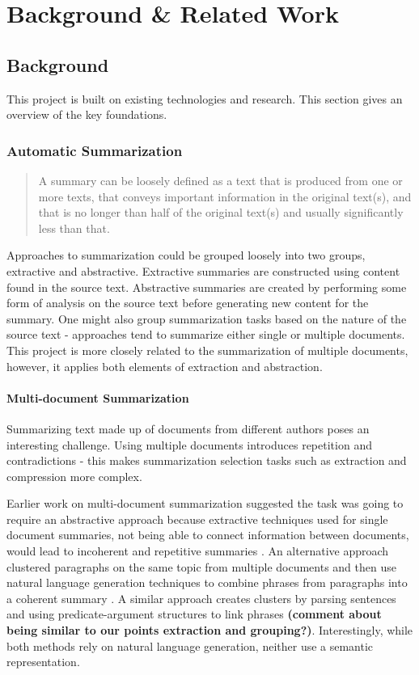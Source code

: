 \chapter{Background \& Related Work\label{chap:background-related}}
  \section{Background}
    This project is built on existing technologies and research. This section gives an overview of the key foundations.

    \subsection{Automatic Summarization}
      \blockquote{A summary can be loosely defined as a text that is produced from one or more texts, that conveys important information in the original text(s), and that is no longer than half of the original text(s) and usually significantly less than that.} \cite{radev2002introduction}

      Approaches to summarization could be grouped loosely into two groups, extractive and abstractive. Extractive summaries are constructed using content found in the source text. Abstractive summaries are created by performing some form of analysis on the source text before generating new content for the summary. One might also group summarization tasks based on the nature of the source text - approaches tend to summarize either single or multiple documents. This project is more closely related to the summarization of multiple documents, however, it applies both elements of extraction and abstraction.

      \subsubsection{Multi-document Summarization}
        Summarizing text made up of documents from different authors poses an interesting challenge. Using multiple documents introduces repetition and contradictions - this makes summarization selection tasks such as extraction and compression more complex.

        Earlier work on multi-document summarization suggested the task was going to require an abstractive approach because extractive techniques used for single document summaries, not being able to connect information between documents, would lead to incoherent and repetitive summaries \cite{McKeown1999TMS315149315355}. An alternative approach clustered paragraphs on the same topic from multiple documents and then use natural language generation techniques to combine phrases from paragraphs into a coherent summary \cite{McKeown1999TMS315149315355}. A similar approach creates clusters by parsing sentences and using predicate-argument structures to link phrases \cite{barzilay1999information} \textbf{(comment about being similar to our points extraction and grouping?)}. Interestingly, while both methods rely on natural language generation, neither use a semantic representation.

